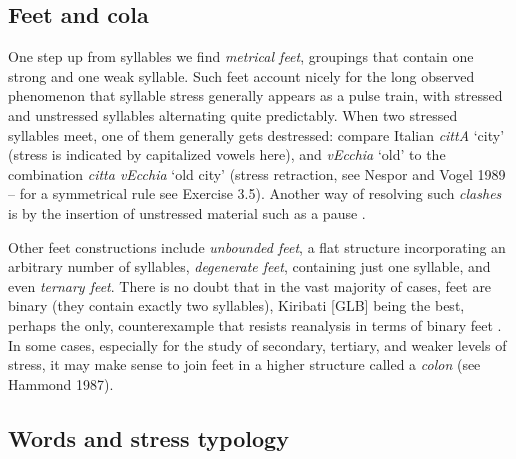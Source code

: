 \subsection{Feet and cola}

One step up from syllables we find {\it metrical feet}, groupings that contain
one strong and one weak syllable. Such feet account nicely for the long
observed phenomenon that syllable stress generally appears as a pulse train,
with stressed and unstressed syllables alternating quite predictably. When two
stressed syllables meet, one of them generally gets destressed: compare Italian
{\it cittA} `city' (stress is indicated by capitalized vowels here), and {\it
vEcchia} `old' to the combination {\it citta vEcchia} `old city' (stress
retraction, see Nespor and Vogel 1989 -- for a symmetrical rule see Exercise
3.5). Another way of resolving such {\it clashes} is by the insertion of
unstressed material such as a pause \cite{Selkirk:1984}. \nocite{Nespor:1989}

Other feet constructions include {\it unbounded feet}, a flat structure
incorporating an arbitrary number of syllables, {\it degenerate feet},
containing just one syllable, and even {\it ternary feet}. There is no doubt
that in the vast majority of cases, feet are binary (they contain exactly two
syllables), Kiribati [GLB] being the best, perhaps the only, counterexample
that resists reanalysis in terms of binary feet \cite{Blevins:1999}.
 In some cases, especially for the study of secondary,
tertiary, and weaker levels of stress, it may make sense to join feet in a
higher structure called a {\it colon} (see Hammond 1987).
\nocite{Hammond:1987}  

\subsection{Words and stress typology}

